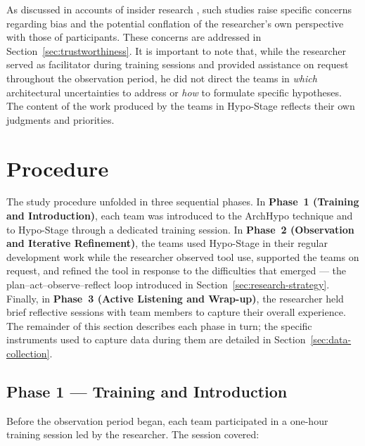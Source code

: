 As discussed in accounts of insider research \citep{robson2016}, such studies raise specific concerns
regarding bias and the potential conflation of the researcher's own perspective with
those of participants. These concerns are addressed in
Section~\ref{sec:trustworthiness}. It is important to note that, while the researcher
served as facilitator during training sessions and provided assistance on request
throughout the observation period, he did not direct the teams in \emph{which}
architectural uncertainties to address or \emph{how} to formulate specific
hypotheses. The content of the work produced by the teams in Hypo-Stage reflects
their own judgments and priorities.

\section{Procedure}
\label{sec:procedure}

The study procedure unfolded in three sequential phases. In \textbf{Phase~1
(Training and Introduction)}, each team was introduced to the ArchHypo technique
and to Hypo-Stage through a dedicated training session. In \textbf{Phase~2
(Observation and Iterative Refinement)}, the teams used Hypo-Stage in their
regular development work while the researcher observed tool use, supported the
teams on request, and refined the tool in response to the difficulties that
emerged --- the plan--act--observe--reflect loop introduced in
Section~\ref{sec:research-strategy}. Finally, in \textbf{Phase~3 (Active
Listening and Wrap-up)}, the researcher held brief reflective sessions with team
members to capture their overall experience. The remainder of this section
describes each phase in turn; the specific instruments used to capture data
during them are detailed in Section~\ref{sec:data-collection}.

\subsection{Phase 1 --- Training and Introduction}

Before the observation period began, each team participated in a one-hour training
session led by the researcher. The session covered:

